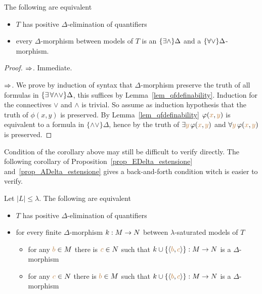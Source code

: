 \begin{corollary}\label{corol_QE}
The following are equivalent
\begin{itemize}
\item[1.] $T$ has positive $\Delta$-elimination of quantifiers
\item[2.] every $\Delta$-morphism between models of $T$ is an $\{\exists\wedge\}\Delta$ and a $\{\forall\vee\}\Delta$-morphism.
\end{itemize}
\end{corollary}
\begin{proof}
$\Rightarrow$. Immediate.

$\Rightarrow$. We prove by induction of syntax that $\Delta$-morphism preserve the truth of all formulas in $\{\exists\,\forall\mathord\wedge\mathord\vee\}\Delta$, this suffices by Lemma~\ref{lem_qfdefinability}. Induction for the connectives $\vee$ and $\wedge$ is trivial.  So assume as induction hypothesis that the truth of  $\phi(x,y)$ is preserved.  By Lemma~\ref{lem_qfdefinability} $\varphi({\color{brown} x},{\color{brown} y})$ is equivalent to a formula in $\{\mathord\wedge\mathord\vee\}\Delta$, hence by  the truth of $\exists{\color{brown}y}\, \varphi ({\color{brown} x},{\color{brown} y})$ and $\forall{\color{brown}y} \,\varphi ({\color{brown} x},{\color{brown} y})$ is preserved.
\end{proof}

Condition  of the corollary above may still be difficult to verify directly. 
The following corollary of Proposition~\ref{prop_EDelta_estensione} and~\ref{prop_ADelta_estensione} gives a back-and-forth condition witch is easier to verify.

\begin{corollary}\label{corol_QE_back_and_forth}
Let $|L|\le\lambda$. The following are equivalent
\begin{itemize}
\item[1.] $T$ has positive $\Delta$-elimination of quantifiers
\item[2.] for every finite $\Delta$-morphism $k:M\rightarrow N$ between $\lambda$-saturated models of $T$
\begin{itemize}
  \item[a.] for any ${\color{brown} b}\in M$ there is ${\color{brown} c}\in N$ such that $k\cup\{\langle{\color{brown}b},{\color{brown} c}\rangle\}:M\rightarrow N$ is a $\Delta$-morphism          
  \item[b.] for any ${\color{brown} c}\in N$ there is ${\color{brown} b}\in M$ such that $k\cup\{\langle{\color{brown}b},{\color{brown} c}\rangle\}:M\rightarrow N$ is a $\Delta$-morphism
\end{itemize}
\end{itemize}
\end{corollary}

